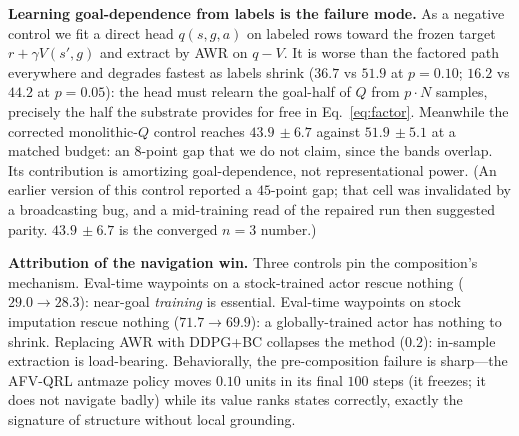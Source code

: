 \documentclass{article}
\newcommand{\pmm}[2]{#1{\scriptstyle\,\pm #2}}
\theoremstyle{plain}
\theoremstyle{definition}
\begin{document}
\textbf{Learning goal-dependence from labels is the failure mode.} As a negative control we fit a direct head $q(s,g,a)$ on labeled rows toward the frozen target $r+\gamma V(s',g)$ and extract by AWR on $q-V$. It is worse than the factored path everywhere and degrades fastest as labels shrink ($36.7$ vs $51.9$ at $p{=}0.10$; $16.2$ vs $44.2$ at $p{=}0.05$): the head must relearn the goal-half of $Q$ from $p\cdot N$ samples, precisely the half the substrate provides for free in Eq.~\ref{eq:factor}. Meanwhile the corrected monolithic-$Q$ control reaches $\pmm{43.9}{6.7}$ against $\pmm{51.9}{5.1}$ at a matched budget: an $8$-point gap that we do not claim, since the bands overlap. Its contribution is amortizing goal-dependence, not representational power. (An earlier version of this control reported a $45$-point gap; that cell was invalidated by a broadcasting bug, and a mid-training read of the repaired run then suggested parity. $\pmm{43.9}{6.7}$ is the converged $n{=}3$ number.)

\textbf{Attribution of the navigation win.} Three controls pin the composition's mechanism. Eval-time waypoints on a stock-trained actor rescue nothing ($29.0\rightarrow 28.3$): near-goal \emph{training} is essential. Eval-time waypoints on stock imputation rescue nothing ($71.7\rightarrow 69.9$): a globally-trained actor has nothing to shrink. Replacing AWR with DDPG+BC collapses the method ($0.2$): in-sample extraction is load-bearing. Behaviorally, the pre-composition failure is sharp---the AFV-QRL antmaze policy moves $0.10$ units in its final $100$ steps (it freezes; it does not navigate badly) while its value ranks states correctly, exactly the signature of structure without local grounding.
\end{document}
